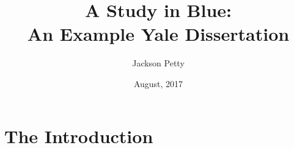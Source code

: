 \documentclass[12pt]{yale-thesis}
\title{A Study in Blue:\\An Example Yale Dissertation}
\author{Jackson Petty}
\date{August, 20\hspace{-.05555em}1\hspace{-.05555em}7}
\begin{document}
\begin{abstract}
	\kant[1]
\end{abstract}

\maketitle

\tableofcontents

\chapter{The Introduction}
\kant[3]
\end{document}
